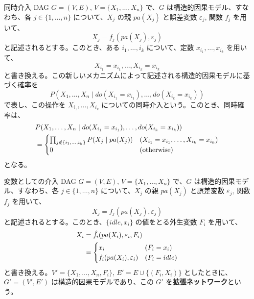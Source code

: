 \documentclass[uplatex, dvipdfmx]{jsarticle}
\begin{document}
\begin{defn}{同時介入}
  DAG $G=(V,E)$, $V=\{X_1, \dots, X_n\}$ で、$G$ は構造的因果モデル、すなわち、各 $j \in \{1, \dots, n\}$ について、$X_j$ の親 $pa(X_j)$ と誤差変数 $\varepsilon_j$, 関数 $f_j$ を用いて、
  \begin{equation}
    X_j = f_j(pa(X_j), \varepsilon_j)
  \end{equation}
  と記述されるとする。このとき、ある $i_1, \dots, i_k$ について、定数 $x_{i_1}, \dots, x_{i_k}$ を用いて、
  \begin{equation}
    X_{i_1} = x_{i_1}, \dots, X_{i_k} = x_{i_k}
  \end{equation}
  と書き換える。この新しいメカニズムによって記述される構造的因果モデルに基づく確率を
  \begin{equation}
    P(X_1, \dots, X_n \mid do(X_{i_1}=x_{i_1}), \dots, do(X_{i_k}=x_{i_k}))
  \end{equation}
  で表し、この操作を $X_{i_1}, \dots, X_{i_k}$ についての同時介入という。このとき、同時確率は、
  \begin{align}
    &P(X_1, \dots, X_n \mid do(X_{i_1}=x_{i_1}), \dots, do(X_{i_k}=x_{i_k})) \notag \\
    &= \begin{cases} 
      \prod_{j \notin \{i_1, \dots, i_k\}} P(X_j \mid pa(X_j)) & (X_{i_1}=x_{i_1}, \dots, X_{i_k}=x_{i_k}) \\ 
      0 & (\text{otherwise}) 
    \end{cases}
  \end{align}
  となる。
\end{defn}

\begin{defn}{変数としての介入}
  DAG $G=(V,E)$, $V=\{X_1, \dots, X_n\}$ で、$G$ は構造的因果モデル、すなわち、各 $j \in \{1, \dots, n\}$ について、$X_j$ の親 $pa(X_j)$ と誤差変数 $\varepsilon_j$, 関数 $f_j$ を用いて、
  \begin{equation}
    X_j = f_j(pa(X_j), \varepsilon_j)
  \end{equation}
  と記述されるとする。このとき、$\{idle, x_i\}$ の値をとる外生変数 $F_i$ を用いて、
  \begin{align}
    X_i &= \hat{f}_i(pa(X_i), \varepsilon_i, F_i) \notag \\
    &= \begin{cases} 
      x_i & (F_i = x_i) \\ 
      f_i(pa(X_i), \varepsilon_i) & (F_i = idle) 
    \end{cases}
  \end{align}
  と書き換える。$V' = \{X_1, \dots, X_n, F_i\}$, $E' = E \cup \{(F_i, X_i)\}$ としたときに、$G' = (V', E')$ は構造的因果モデルであり、この $G'$ を\textbf{拡張ネットワーク}という。
\end{defn}
\end{document}
